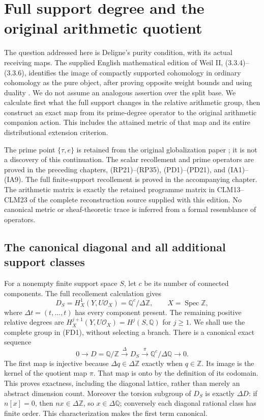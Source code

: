 \section{Full support degree and the original arithmetic quotient}
\label{sec:full-support-degree}
The question addressed here is Deligne's purity condition, with its
actual receiving maps. The supplied English mathematical edition of
Weil II, (3.3.4)--(3.3.6), identifies the image of compactly supported
cohomology in ordinary cohomology as the pure object, after proving
opposite weight bounds and using duality \cite{DeligneII}. We do not
assume an analogous assertion over the split base. We calculate first
what the full support changes in the relative arithmetic group, then
construct an exact map from its prime-degree operator to the original
arithmetic companion action. This includes the attained metric of that
map and its entire distributional extension criterion.

The prime point $\{\tau,e\}$ is retained from the original globalization
paper \cite{globalization}; it is not a discovery of this continuation.
The scalar recollement and prime operators are proved in the preceding
chapters, (RP21)--(RP35), (PD1)--(PD21), and (IA1)--(IA9).
The full finite-support recollement is proved in the accompanying
chapter. The arithmetic matrix is exactly the retained programme
matrix in CLM13--CLM23 of the complete reconstruction source supplied
with this edition. No canonical metric or sheaf-theoretic trace is
inferred from a formal resemblance of operators.

\subsection{The canonical diagonal and all additional support classes}
For a nonempty finite support space $S$, let $c$ be its number of
connected components. The full recollement calculation gives
\[
 D_S=H^1_X(Y,U\mathcal O_X)=\mathbb Q^c/\Delta\mathbb Z,
 \qquad X=\operatorname{Spec}\mathbb Z,
 \tag{FD1}
\]
where $\Delta t=(t,\ldots,t)$ has every component present.
The remaining positive relative degrees are
$H_X^{j+1}(Y,U\mathcal O_X)=H^j(S,\mathbb Q)$ for $j\ge1$.
We shall use the complete group in (FD1), without selecting a branch.
There is a canonical exact sequence
\[
 0\longrightarrow D=\mathbb Q/\mathbb Z
 \xrightarrow{\Delta}D_S
 \xrightarrow{\pi}\mathbb Q^c/\Delta\mathbb Q
 \longrightarrow0.
 \tag{FD2}
\]
The first map is injective because $\Delta q\in\Delta\mathbb Z$
exactly when $q\in\mathbb Z$. Its image is the kernel of the quotient
map $\pi$. That map is onto by the definition of its codomain. This
proves exactness, including the diagonal lattice, rather than merely
an abstract dimension count. Moreover the torsion subgroup of $D_S$
is exactly $\Delta D$: if $n[x]=0$, then $nx\in\Delta\mathbb Z$,
so $x\in\Delta\mathbb Q$; conversely each diagonal rational class
has finite order. This characterization makes the first term canonical.

